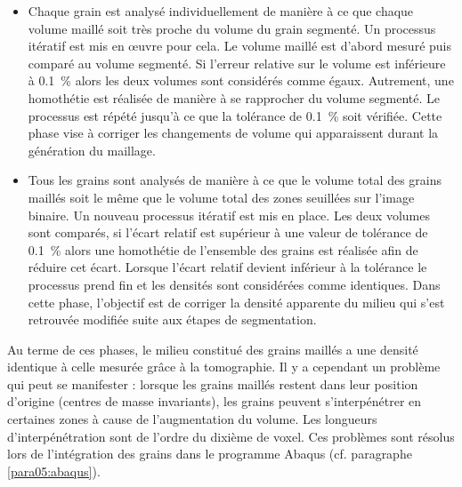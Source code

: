 			\begin{itemize}
				\item Chaque grain est analysé individuellement de manière à ce que chaque volume maillé soit très proche du volume du grain segmenté. Un processus itératif est mis en \oe{}uvre pour cela. Le volume maillé est d'abord mesuré puis comparé au volume segmenté. Si l'erreur relative sur le volume est inférieure à \SI{0.1}{\percent} alors les deux volumes sont considérés comme égaux. Autrement, une homothétie est réalisée de manière à se rapprocher du volume segmenté. Le processus est répété jusqu'à ce que la tolérance de \SI{0.1}{\percent} soit vérifiée. Cette phase vise à corriger les changements de volume qui apparaissent durant la génération du maillage.
				\item Tous les grains sont analysés de manière à ce que le volume total des grains maillés soit le même que le volume total des zones seuillées sur l'image binaire. Un nouveau processus itératif est mis en place. Les deux volumes sont comparés, si l'écart relatif est supérieur à une valeur de tolérance de \SI{0.1}{\percent} alors une homothétie de l'ensemble des grains est réalisée afin de réduire cet écart. Lorsque l'écart relatif devient inférieur à la tolérance le processus prend fin et les densités sont considérées comme identiques. Dans cette phase, l'objectif est de corriger la densité apparente du milieu qui s'est retrouvée modifiée suite aux étapes de segmentation.
			\end{itemize}
			Au terme de ces phases, le milieu constitué des grains maillés a une densité identique à celle mesurée grâce à la tomographie. Il y a cependant un problème qui peut se manifester : lorsque les grains maillés restent dans leur position d'origine (centres de masse invariants), les grains peuvent s'interpénétrer en certaines zones à cause de l'augmentation du volume. Les longueurs d'interpénétration sont de l'ordre du dixième de voxel. Ces problèmes sont résolus lors de l'intégration des grains dans le programme Abaqus (cf. paragraphe \ref{para05:abaqus}).

